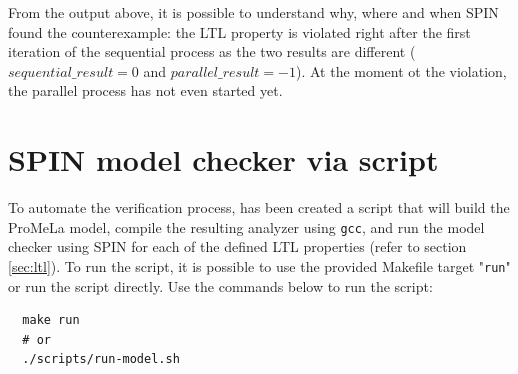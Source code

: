 \documentclass[a4paper, 11pt]{article}
\begin{document}
From the output above, it is possible to understand why, where and when SPIN found the counterexample: the LTL property is violated right after the first iteration of the sequential process as the two results are different ($sequential\_result = 0$ and $parallel\_result = -1$). At the moment ot the violation, the parallel process has not even started yet.

\section{SPIN model checker via script}

To automate the verification process, has been created a script that will build the ProMeLa model, compile the resulting analyzer using \texttt{gcc}, and run the model checker using SPIN for each of the defined LTL properties (refer to section \ref{sec:ltl}). To run the script, it is possible to use the provided Makefile target "\texttt{run}" or run the script directly. Use the commands below to run the script:

\begin{lstlisting}
  make run
  # or
  ./scripts/run-model.sh
\end{lstlisting}
\end{document}
